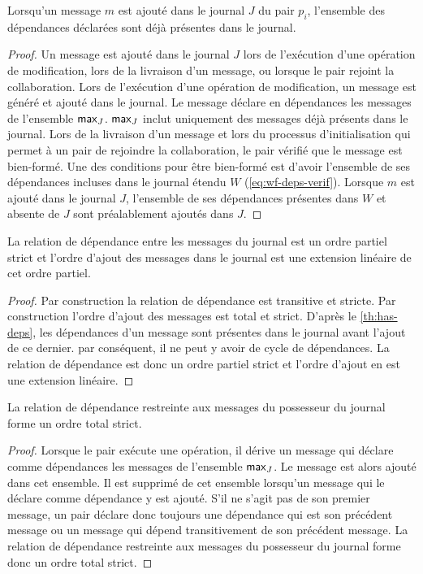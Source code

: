 \begin{lemma}\label{th:has-deps}
Lorsqu'un message $m$ est ajouté dans le journal $J$ du pair $p_i$, l'ensemble des dépendances déclarées sont déjà présentes dans le journal.
\end{lemma} 
\begin{proof}
Un message est ajouté dans le journal $J$ lors de l'exécution d'une opération de modification, lors de la livraison d'un message, ou lorsque le pair rejoint la collaboration.
Lors de l'exécution d'une opération de modification, un message est généré et ajouté dans le journal.
Le message déclare en dépendances les messages de l'ensemble $\operatorname{\mathsf{max}}_J$.
$\operatorname{\mathsf{max}}_J$ inclut uniquement des messages déjà présents dans le journal.
Lors de la livraison d'un message et lors du processus d'initialisation qui permet à un pair de rejoindre la collaboration, le pair vérifié que le message est bien-formé.
Une des conditions pour être bien-formé est d'avoir l'ensemble de ses dépendances incluses dans le journal étendu $W$ (\autoref{eq:wf-deps-verif}).
Lorsque $m$ est ajouté dans le journal $J$, l'ensemble de ses dépendances présentes dans $W$ et absente de $J$ sont préalablement ajoutés dans $J$.
\end{proof}

\begin{lemma}
La relation de dépendance entre les messages du journal est un ordre partiel strict et l'ordre d'ajout des messages dans le journal est une extension linéaire de cet ordre partiel.
\end{lemma}
\begin{proof}
Par construction la relation de dépendance est transitive et stricte.
Par construction l'ordre d'ajout des messages est total et strict.
D'après le \autoref{th:has-deps}, les dépendances d'un message sont présentes dans le journal avant l'ajout de ce dernier.
par conséquent, il ne peut y avoir de cycle de dépendances.
La relation de dépendance est donc un ordre partiel strict et l'ordre d'ajout en est une extension linéaire.
\end{proof}

\begin{lemma}\label{th:total-dep-owner}
La relation de dépendance restreinte aux messages du possesseur du journal forme un ordre total strict.
\end{lemma}
\begin{proof}
Lorsque le pair exécute une opération, il dérive un message qui déclare comme dépendances les messages de l'ensemble $\operatorname{\mathsf{max}}_J$.
Le message est alors ajouté dans cet ensemble.
Il est supprimé de cet ensemble lorsqu'un message qui le déclare comme dépendance y est ajouté.
S'il ne s'agit pas de son premier message, un pair déclare donc toujours une dépendance qui est son précédent message ou un message qui dépend transitivement de son précédent message.
La relation de dépendance restreinte aux messages du possesseur du journal forme donc un ordre total strict.
\end{proof}

